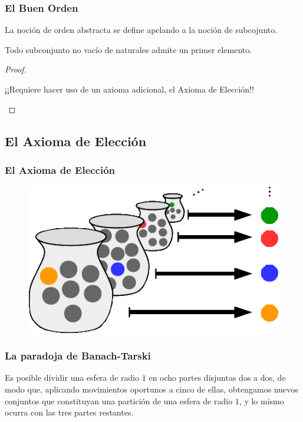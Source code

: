\begin{frame}
 \frametitle{El Buen Orden}

\justify
La noción de orden abstracta se define apelando a la noción de subcojunto.\\

\pause
 \begin{theorem}
  Todo subconjunto no vacío de naturales admite un primer elemento.
 \end{theorem}
 
 \pause
 \begin{proof}
  \begin{center}
  ¡¡Requiere hacer uso de un axioma adicional, el Axioma de Elección!!
  \end{center}
 \end{proof}
\end{frame}

\subsection{El Axioma de Elección}

\begin{frame}
 \frametitle{El Axioma de Elección}
 
 \begin{figure}
\includegraphics[width=0.7\linewidth]{IMGS/choice}
\end{figure}
\end{frame}
  
 \begin{frame}
 \frametitle{La paradoja de Banach-Tarski}
 
 \begin{theorem}
  Es posible dividir una esfera de radio $1$ en ocho partes disjuntas dos a dos, de modo que, aplicando movimientos oportunos a cinco de ellas, obtengamos 
  nuevos conjuntos que constituyan una partición de una esfera de radio $1$, y lo mismo ocurra con las tres partes restantes.
 \end{theorem}
\end{frame}

